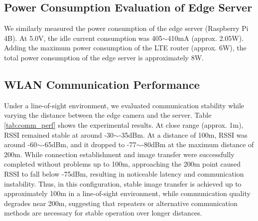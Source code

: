 \documentclass[conference]{IEEEtran}
\begin{document}
\begin{table}[tb]
    \caption{Power Consumption of Edge Camera (5.0V)}
    \label{tab:camera_power}
    \vspace{-0.2cm}
    \begin{center}\footnotesize
    \end{center}
    \vspace{-0.4cm}
\end{table}

\subsection{Power Consumption Evaluation of Edge Server}
We similarly measured the power consumption of the edge server (Raspberry Pi 4B). At 5.0V, the idle current consumption was 405$\sim$410mA (approx. 2.05W). Adding the maximum power consumption of the LTE router (approx. 6W), the total power consumption of the edge server is approximately 8W.

\subsection{WLAN Communication Performance}
Under a line-of-sight environment, we evaluated communication stability while varying the distance between the edge camera and the server. Table \ref{tab:comm_perf} shows the experimental results. At close range (approx. 1m), RSSI remained stable at around -30$\sim$-35dBm. At a distance of 100m, RSSI was around -60$\sim$-65dBm, and it dropped to -77$\sim$-80dBm at the maximum distance of 200m. While connection establishment and image transfer were successfully completed without problems up to 100m, approaching the 200m point caused RSSI to fall below -75dBm, resulting in noticeable latency and communication instability. Thus, in this configuration, stable image transfer is achieved up to approximately 100m in a line-of-sight environment, while communication quality degrades near 200m, suggesting that repeaters or alternative communication methods are necessary for stable operation over longer distances.
\end{document}
